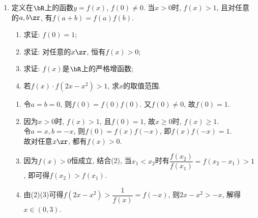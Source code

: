 \begin{enumerate}
\begin{jieda}
\begin{enumerate}
    \item $g(x)=\frac{x^{2}}{x^{2}+2 x+1}+\frac{2}{x}+3=\left(\frac{x}{x+1}\right)^{2}+\frac{2}{\frac{x}{x+1}}+1$,
    设 $t=\frac{x}{x+1}=1-\frac{1}{x+1}, t=1-\frac{1}{x+1}$ 在 $[1,+\infty)$ 上单调增, 当 $x \rightarrow+\infty$ 时, $t \rightarrow 1$,
    所以 $t \in\left[\frac{1}{2}, 1\right)$,\\
    令 $h(t)=t^{2}+\frac{2}{t}+1, t \in\left[\frac{1}{2}, 1\right)$,
    由 (1) 可知, $h(t)$ 在 $\left[\frac{1}{2}, 1\right)$ 上单调减,
    又 $h\left(\frac{1}{2}\right)=\frac{21}{4}, h(1)=4$, 所以 $h(t) \in\left(4, \frac{21}{4}\right]$,
    所以 $g(x)$ 的值域为 $\left(4, \frac{21}{4}\right]$ 。
\end{enumerate}
\end{jieda}
\begin{vspace_}
\vsp[5]
\end{vspace_}

\item 定义在$\bR$上的函数$y=f(x)$, $f(0)\neq 0$. 当$x>0$时, $f(x)>1$, 且对任意的$a,b\zr$, 有$f(a+b)=f(a)f(b)$. 
\begin{enumerate}[(1)]
\item 求证: $f(0)=1$; 
\item 求证: 对任意的$x\zr$, 恒有$f(x)>0$; 
\item 求证: $f(x)$是$\bR$上的严格增函数; 
\item 若$f(x)\cdot f(2x-x^2)>1$, 求$x$的取值范围. 
\end{enumerate}
\begin{jieda}
\begin{enumerate}[(1)]
\item 令$a=b=0$, 则$f(0)=f(0)f(0)$. 又$f(0)\neq 0$, 故$f(0)=1$. 
\item 因为$x>0$时, $f(x)>1$, 且$f(0)=1$, 故$x\geq 0$时, $f(x)\geq 1$. \\
令$a=x,b=-x$, 则$f(0)=f(x)f(-x)$, 即$f(x)f(-x)=1$. \\
故对任意$x\zr$, 都有$f(x)>0$. 
\item 因为$f(x)>0$恒成立, 结合(2), 当$x_1<x_2$时有$\dfrac{f(x_2)}{f(x_1)}=f(x_2-x_1)>1$, 
即可得$f(x_2)>f(x_1)$. 
\item 由(2)(3)可得$f(2x-x^2)>\dfrac{1}{f(x)}=f(-x)$, 则$2x-x^2>-x$, 解得$x\in(0,3)$. 
\end{enumerate}
\end{jieda}

\begin{vspace_}
\vsp[5]
\end{vspace_}



\end{enumerate}
